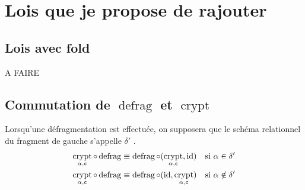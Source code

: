 \documentclass[french]{article}
\DeclareMathOperator{\defrag}{defrag}
\DeclareMathOperator{\crypt}{crypt}
\DeclareMathOperator{\id}{id}
\newcommand\typeT[1]{\text{\ttfamily #1}}
\newcommand{\cryptArgs}[2]{\crypt_{#1 , \typeT{#2}}}
\newcommand{\cryptCAlpha}{\cryptArgs{\alpha}{c}}
\begin{document}
\section*{Lois que je propose de rajouter}
\subsection*{Lois avec fold}
A FAIRE
\subsection*{Commutation de $\defrag$ et $\crypt$}
Lorsqu'une défragmentation est effectuée, on supposera que le schéma relationnel
du fragment de gauche s'appelle $\delta'$ .
\begin{align}
\cryptCAlpha \circ \defrag 
& \equiv \defrag \circ (\cryptCAlpha, \id)
& \text{si $\alpha \in \delta'$} \\
\cryptCAlpha \circ \defrag 
& \equiv \defrag \circ (\id, \cryptCAlpha)
& \text{si $\alpha \notin \delta'$} 
\end{align}
\end{document}
